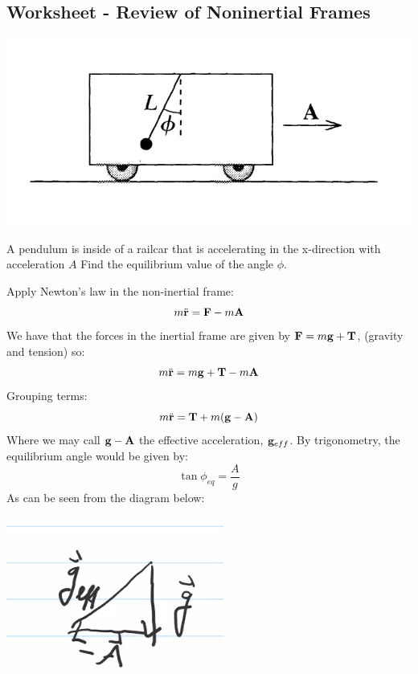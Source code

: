 \documentclass[../PHYS306Notes.tex]{subfiles}
\begin{document}
\subsection{Worksheet - Review of Noninertial Frames}

\begin{center}
    \includegraphics[scale=0.5]{Lecture-14/w14-img1.png}
\end{center}

\begin{p}
A pendulum is inside of a railcar that is accelerating in the x-direction with acceleration $A$  Find the equilibrium value of the angle $\phi$. 
\end{p}
\begin{s}
Apply Newton's law in the non-inertial frame:
\[m\ddot{\mathbf{r}} = \mathbf{F} - m\mathbf{A}\]
We have that the forces in the inertial frame are given by $\mathbf{F} = m\mathbf{g} + \mathbf{T}$, (gravity and tension) so:
\[m\ddot{\mathbf{r}} = m\mathbf{g} + \mathbf{T} - m\mathbf{A}\]
Grouping terms:
\[m\ddot{\mathbf{r}} = \mathbf{T} + m(\mathbf{g} - \mathbf{A})\]
Where we may call $\mathbf{g} - \mathbf{A}$ the effective acceleration, $\mathbf{g}_{eff}$. By trigonometry, the equilibrium angle would be given by:
\[\tan\phi_{eq} = \frac{A}{g}\] As can be seen from the diagram below:
\begin{center}
    \includegraphics[scale=0.8]{Lecture-14/w14-img2.png}
\end{center}
\end{s}
\end{document}
